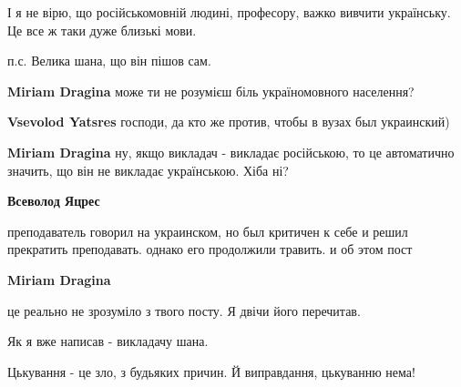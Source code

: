 \begin{itemize}
\begin{itemize}
І я не вірю, що російськомовній людині, професору, важко вивчити українську. Це
все ж таки дуже близькі мови.  

п.с. Велика шана, що він пішов сам.

 
\textbf{Miriam Dragina} може ти не розумієш біль україномовного населення?

 
\textbf{Vsevolod Yatsres} господи, да кто же против, чтобы в вузах был украинский)

 
\textbf{Miriam Dragina} ну, якщо викладач - викладає російською, то це
автоматично значить, що він не викладає українською. Хіба ні?

 
\textbf{Всеволод Яцрес} 

преподаватель говорил на украинском, но был критичен к себе и решил прекратить
преподавать. однако его продолжили травить. и об этом пост

 
\textbf{Miriam Dragina} 

це реально не зрозуміло з твого посту. Я двічи його перечитав.

Як я вже написав - викладачу шана.

Цькування - це зло, з будьяких причин. Й виправдання, цькуванню нема!


\end{itemize}
\end{itemize}
